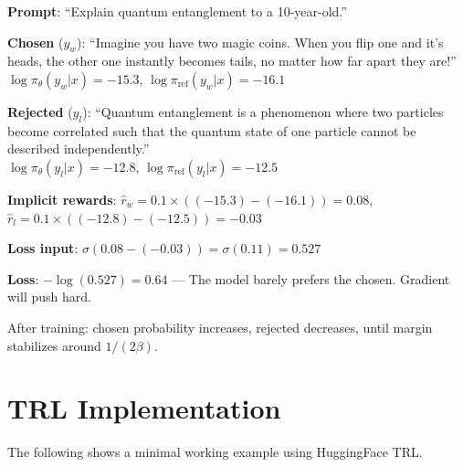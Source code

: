 \begin{examplebox}
\textbf{Prompt}: ``Explain quantum entanglement to a 10-year-old.''

\textbf{Chosen} ($y_w$): ``Imagine you have two magic coins. When you flip one and it’s heads, the other one instantly becomes tails, no matter how far apart they are!''\\

$\log\pi_\theta(y_w|x) = -15.3$, $\log\pi_\text{ref}(y_w|x) = -16.1$

\textbf{Rejected} ($y_l$): ``Quantum entanglement is a phenomenon where two particles become correlated such that the quantum state of one particle cannot be described independently.''\\

$\log\pi_\theta(y_l|x) = -12.8$, $\log\pi_\text{ref}(y_l|x) = -12.5$

\textbf{Implicit rewards}: $\hat{r}_w = 0.1 \times ((-15.3) - (-16.1)) = 0.08$, $\hat{r}_l = 0.1 \times ((-12.8) - (-12.5)) = -0.03$

\textbf{Loss input}: $\sigma(0.08 - (-0.03)) = \sigma(0.11) = 0.527$

\textbf{Loss}: $-\log(0.527) = 0.64$ --- The model barely prefers the chosen. Gradient will push hard.

After training: chosen probability increases, rejected decreases, until margin stabilizes around $1/(2\beta)$.
\end{examplebox}

\section{TRL Implementation}
\label{trl-implementation}

The following shows a minimal working example using HuggingFace TRL.

